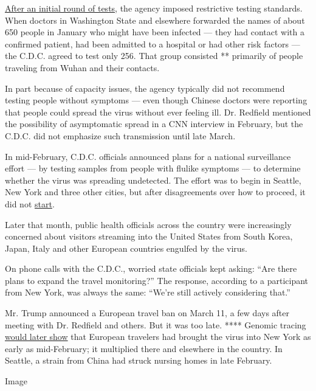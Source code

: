 \href{https://www.documentcloud.org/documents/6933936-2020-01-23-SEA-TAC-CASE-Emails-from-the-Start-of.html}{After
an initial round of tests}, the agency imposed restrictive testing
standards. When doctors in Washington State and elsewhere forwarded the
names of about 650 people in January who might have been infected ---
they had contact with a confirmed patient, had been admitted to a
hospital or had other risk factors --- the C.D.C. agreed to test only
256. That group consisted ** primarily of people traveling from Wuhan
and their contacts.

In part because of capacity issues, the agency typically did not
recommend testing people without symptoms --- even though Chinese
doctors were reporting that people could spread the virus without ever
feeling ill. Dr. Redfield mentioned the possibility of asymptomatic
spread in a CNN interview in February, but the C.D.C. did not emphasize
such transmission until late March.

In mid-February, C.D.C. officials announced plans for a national
surveillance effort --- by testing samples from people with flulike
symptoms --- to determine whether the virus was spreading undetected.
The effort was to begin in Seattle, New York and three other cities, but
after disagreements over how to proceed, it did not
\href{https://www.documentcloud.org/documents/6933935-CDC-and-State-Health-Officials-Debate-Start-up.html}{start}.

Later that month, public health officials across the country were
increasingly concerned about visitors streaming into the United States
from South Korea, Japan, Italy and other European countries engulfed by
the virus.

On phone calls with the C.D.C., worried state officials kept asking:
``Are there plans to expand the travel monitoring?'' The response,
according to a participant from New York, was always the same: ``We're
still actively considering that.''

Mr. Trump announced a European travel ban on March 11, a few days after
meeting with Dr. Redfield and others. But it was too late. **** Genomic
tracing
\href{https://www.nytimes3xbfgragh.onion/2020/04/08/science/new-york-coronavirus-cases-europe-genomes.html}{would
later show} that European travelers had brought the virus into New York
as early as mid-February; it multiplied there and elsewhere in the
country. In Seattle, a strain from China had struck nursing homes in
late February.

Image

